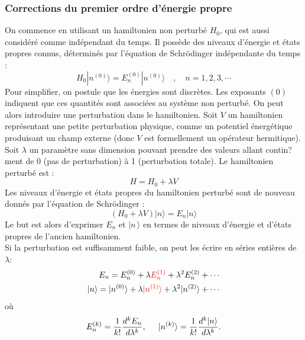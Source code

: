 \documentclass{article}
\begin{document}
\subsubsection{Corrections du premier ordre d'\'energie propre}
On commence en utilisant un hamiltonien non perturb\'e $\scriptstyle H_0$, qui est aussi consid\'er\'e comme ind\'ependant du temps. Il poss\`ede des niveaux d'\'energie et \'etats propres connus, d\'etermin\'es par l'\'equation de Schr\"odinger ind\'ependante du temps :
$$
 H_0 |n^{(0)}\rangle = E_n^{(0)} |n^{(0)}\rangle \quad,\quad n = 1, 2, 3, \cdots
$$
Pour simplifier, on postule que les \'energies sont discr\`etes. Les exposants $\scriptstyle (0)$ indiquent que ces quantit\'es sont associ\'ees au syst\`eme non perturb\'e.
On peut alors introduire une perturbation dans le hamiltonien. Soit $\scriptstyle V$ un hamiltonien repr\'esentant une petite perturbation physique, comme un potentiel \'energ\'etique produisant un champ externe (donc $\scriptstyle V$ est formellement un op\'erateur hermitique). Soit $\scriptstyle \lambda$ un param\`etre sans dimension pouvant prendre des valeurs allant contin?ment de 0 (pas de perturbation) \`a 1 (perturbation totale). Le hamiltonien perturb\'e est :
$$
H = H_0 + \lambda V
$$
Les niveaux d'\'energie et \'etats propres du hamiltonien perturb\'e sont de nouveau donn\'es par l'\'equation de Schr\"odinger :
$$
 \left(H_0 + \lambda V \right) |n\rangle = E_n|n\rangle
$$
Le but est alors d'exprimer $\scriptstyle E_n$ et $\scriptstyle\mid n\,\rangle$  en termes de niveaux d'\'energie et d'\'etats propres de l'ancien hamiltonien.\\
Si la perturbation est suffisamment faible, on peut les \'ecrire en s\'eries enti\`eres de $\lambda$:
$$
\begin{aligned}
E_n = E_n^{(0)} + \lambda \red{E_n^{(1)}} + \lambda^2 E_n^{(2)} + \cdots \\
|n\rangle = |n^{(0)}\rangle + \lambda \red{|n^{(1)}\rangle} + \lambda^2 |n^{(2)}\rangle + \cdots
\end{aligned}
$$
o\`u
$$
 E_n^{(k)} = \frac{1}{k!} \frac{d^k E_n}{d \lambda^k} , \hspace{0.5cm}
 |n^{(k)}\rangle = \frac{1}{k!}\frac{d^k |n\rangle }{d \lambda^k}.
$$
\end{document}
